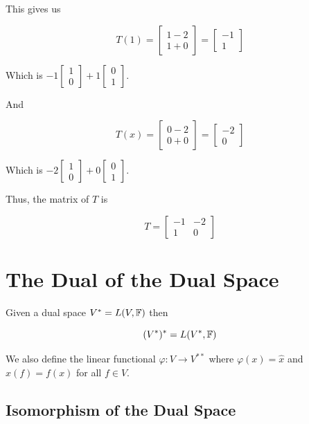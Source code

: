 This gives us

\[
    T(1) = \begin{bmatrix} 1 - 2 \\ 1 + 0 \end{bmatrix} = \begin{bmatrix} -1 \\ 1 \end{bmatrix}
\]

Which is \(-1\begin{bmatrix} 1 \\ 0 \end{bmatrix} + 1\begin{bmatrix} 0 \\ 1 \end{bmatrix}\).

And

\[
    T(x) = \begin{bmatrix} 0 - 2 \\ 0 + 0 \end{bmatrix} = \begin{bmatrix} -2 \\ 0 \end{bmatrix}
\]

Which is \(-2\begin{bmatrix} 1 \\ 0 \end{bmatrix} + 0\begin{bmatrix} 0 \\ 1 \end{bmatrix}\).

Thus, the matrix of \(T\) is

\[
    T =
    \begin{bmatrix}
        -1 & -2 \\
        1  & 0
    \end{bmatrix}
\]


\section{The Dual of the Dual Space}

Given a dual space \(V^* = L(V, \mathbb{F}) \) then 

\[
    (V^*)^* = L(V^*, \mathbb{F})
\]


We also define the linear functional \(\varphi: V \to V^{**}\) where \(\varphi(x) = \hat{x}\) and \(\hat{x}(f) = f(x)\) for all \(f \in V\).

\subsection{Isomorphism of the Dual Space}

